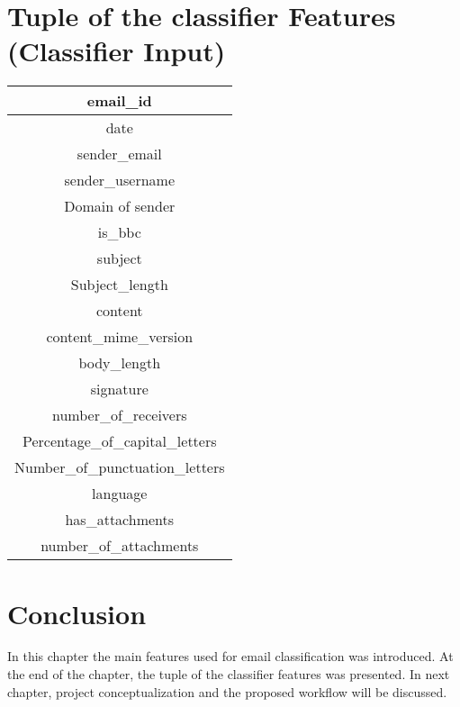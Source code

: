 \newpage
\section {Tuple of the classifier Features (Classifier Input)}

\begin{center}
\begin{tabular}{|c|}
\hline 
email\_id\tabularnewline
\hline
date\tabularnewline
\hline 
sender\_email\tabularnewline
\hline 
sender\_username\tabularnewline
\hline 
Domain of sender\tabularnewline
\hline 
is\_bbc\tabularnewline
\hline 
subject\tabularnewline
\hline 
Subject\_length\tabularnewline
\hline 
content\tabularnewline
\hline 
content\_mime\_version\tabularnewline
\hline 
body\_length\tabularnewline
\hline 
signature\tabularnewline
\hline 
number\_of\_receivers\tabularnewline
\hline 
Percentage\_of\_capital\_letters\tabularnewline
\hline 
Number\_of\_punctuation\_letters\tabularnewline
\hline 
language\tabularnewline
\hline 
has\_attachments\tabularnewline
\hline 
number\_of\_attachments\tabularnewline
\hline
\end{tabular}
\end{center}

\newpage


\section{Conclusion}
In this chapter the main features used for email classification was introduced.
At the end of the chapter, the tuple of the classifier features was presented.
In next chapter, project conceptualization and the proposed workflow will be 
discussed.
